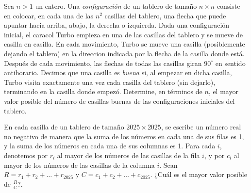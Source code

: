 \documentclass[11pt]{scrartcl}
\begin{document}
\begin{problema} [EGMO 2025/5]
    Sea $n>1$ un entero. Una \textit{configuración} de un tablero de tamaño $n \times n$ consiste en colocar, en cada una de las $n^2$ casillas del tablero, una flecha que puede apuntar hacia arriba, abajo, la derecha o izquierda. Dada una configuración inicial, el caracol Turbo empieza en una de las casillas del tablero y se mueve de casilla en casilla. En cada movimiento, Turbo se mueve una casilla (posiblemente dejando el tablero) en la direccion indicada por la flecha de la casilla donde está. Después de cada movimiento, las flechas de todas las casillas giran $90^{\circ}$ en sentido antihorario. Decimos que una casilla es \textit{buena} si, al empezar en dicha casilla, Turbo visita exactamente una vez cada casilla del tablero (sin dejarlo), terminando en la casilla donde empezó. Determine, en términos de $n$, el mayor valor posible del número de casillas buenas de las configuraciones iniciales del tablero.
\end{problema}

\begin{problema} [EGMO 2025/6]
    En cada casilla de un tablero de tamaño $2025 \times 2025$, se escribe un número real no negativo de manera que la suma de los números en cada una de sus filas es 1, y la suma de los números en cada una de sus columnas es 1. Para cada $i$, denotemos por $r_i$ al mayor de los números de las casillas de la fila $i$, y por $c_i$ al mayor de los números de las casillas de la columna $i$. Sean $R=r_1+r_2+\ldots+r_{2025}$ y $C=c_1+c_2+\ldots+c_{2025}$. ¿Cuál es el mayor valor posible de $\frac RC$?.
\end{problema}
\end{document}
